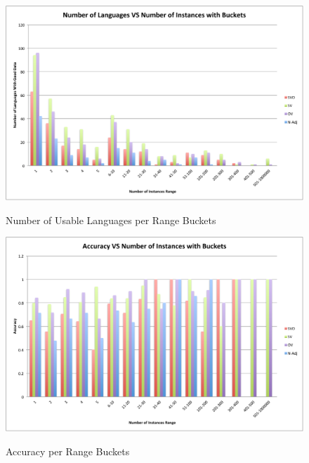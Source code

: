 \documentclass[]{article}
\begin{document}
\begin{figure}[H]
\caption{Number of Usable Languages per Range Buckets}
\hspace{-2mm} 
\includegraphics[width=\textwidth]{NumberOfLanguagesVsNumberOfInstancesWithBuckets.pdf}
\label{fig:label}
\end{figure}

\begin{figure}[H]
\caption{Accuracy per Range Buckets}
\hspace{-2mm} 
\includegraphics[width=\textwidth]{AccuracyVsNumberOfInstancesWithBuckets.pdf}
\label{fig:label}
\end{figure}
\end{document}
